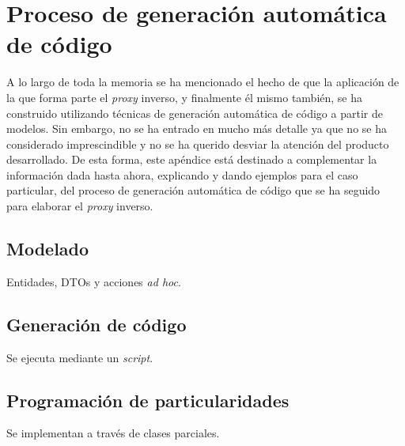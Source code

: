 \documentclass[11pt,spanish,listoffigures]{tfgetsinf}
\begin{document}

\APPENDIX

\chapter{Proceso de generación automática de código}

A lo largo de toda la memoria se ha mencionado el hecho de que la aplicación de la que forma parte el \emph{proxy} inverso, y finalmente él mismo también, se ha construido utilizando técnicas de generación automática de código a partir de modelos. Sin embargo, no se ha entrado en mucho más detalle ya que no se ha considerado imprescindible y no se ha querido desviar la atención del producto desarrollado. De esta forma, este apéndice está destinado a complementar la información dada hasta ahora, explicando y dando ejemplos para el caso particular, del proceso de generación automática de código que se ha seguido para elaborar el \emph{proxy} inverso.

	\section{Modelado}

Entidades, DTOs y acciones \emph{ad hoc}.

	\section{Generación de código}

Se ejecuta mediante un \emph{script}.

	\section{Programación de particularidades}

Se implementan a través de clases parciales.
\end{document}

